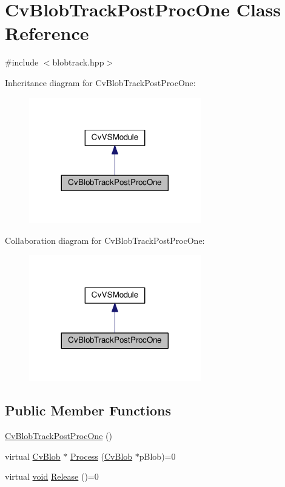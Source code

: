 \hypertarget{classCvBlobTrackPostProcOne}{\section{Cv\-Blob\-Track\-Post\-Proc\-One Class Reference}
\label{classCvBlobTrackPostProcOne}
}


{\ttfamily \#include $<$blobtrack.\-hpp$>$}



Inheritance diagram for Cv\-Blob\-Track\-Post\-Proc\-One\-:\nopagebreak
\begin{figure}[H]
\begin{center}
\leavevmode
\includegraphics[width=212pt]{classCvBlobTrackPostProcOne__inherit__graph}
\end{center}
\end{figure}


Collaboration diagram for Cv\-Blob\-Track\-Post\-Proc\-One\-:\nopagebreak
\begin{figure}[H]
\begin{center}
\leavevmode
\includegraphics[width=212pt]{classCvBlobTrackPostProcOne__coll__graph}
\end{center}
\end{figure}
\subsection*{Public Member Functions}
\begin{DoxyCompactItemize}
\item 
\hyperlink{classCvBlobTrackPostProcOne_a59409a6e9556935cb291a428ad1521c7}{Cv\-Blob\-Track\-Post\-Proc\-One} ()
\item 
virtual \hyperlink{structCvBlob}{Cv\-Blob} $\ast$ \hyperlink{classCvBlobTrackPostProcOne_a8547d07579810236aa0a62cca4d35b78}{Process} (\hyperlink{structCvBlob}{Cv\-Blob} $\ast$p\-Blob)=0
\item 
virtual \hyperlink{legacy_8hpp_a8bb47f092d473522721002c86c13b94e}{void} \hyperlink{classCvBlobTrackPostProcOne_a7c7e573c6b0f4ea73651f4f1bb5c8df6}{Release} ()=0
\end{DoxyCompactItemize}
